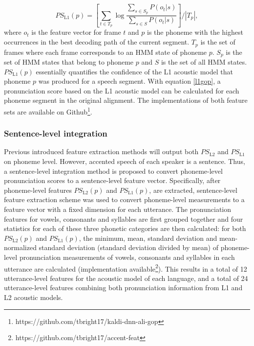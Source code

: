 \begin{equation}
\label{l1gop}
PS_{\mathrm{L1}}(p) = \left [ \sum_{t \in T_p} \log \frac{ \sum_{s \in S_p}P(o_t|s)}  { \sum_{s \in S}P(o_t|s)} \right ] /\left | T_p \right |,
\end{equation}
where $o_t$ is the feature vector for frame $t$ and $p$ is the phoneme with the highest occurrences in the best decoding path of the current segment. $T_p$ is the set of frames where each frame corresponds to an HMM state of phoneme $p$. $S_p$ is the set of HMM states that belong to phoneme $p$ and $S$ is the set of all HMM states. $PS_{\mathrm{L1}}(p)$ essentially quantifies the confidence of the L1 acoustic model that phoneme $p$ was produced for a speech segment. With equation \ref{l1gop}, a pronunciation score based on the L1 acoustic model can be calculated for each phoneme segment in the original alignment. The implementations of both feature sets are available on Github\footnote{https://github.com/tbright17/kaldi-dnn-ali-gop}.

\subsubsection{Sentence-level integration}

Previous introduced feature extraction methods will output both $PS_{\mathrm{L2}}$ and $PS_{\mathrm{L1}}$ on phoneme level. However, accented speech of each speaker is a sentence. Thus, a sentence-level integration method is proposed to convert phoneme-level pronunciation scores to a sentence-level feature vector. Specifically, after phoneme-level features $PS_{\mathrm{L2}}(p)$ and $PS_{\mathrm{L1}}(p)$, are extracted, \a sentence-level feature extraction scheme was used to convert phoneme-level measurements to a feature vector with a fixed dimension for each utterance. The pronunciation features for vowels, consonants and syllables are first grouped together and four statistics for each of these three phonetic categories are then calculated: for both $PS_{\mathrm{L2}}(p)$ and $PS_{\mathrm{L1}}(p)$, the minimum, mean, standard deviation and mean-normalized standard deviation (standard deviation divided by mean) of phoneme-level pronunciation measurements of vowels, consonants and syllables in each utterance are calculated (implementation available\footnote{https://github.com/tbright17/accent-feat}). This results in a total of 12 utterance-level features for the acoustic model of each language, and a total of 24 utterance-level features combining both pronunciation information from L1 and L2 acoustic models.

